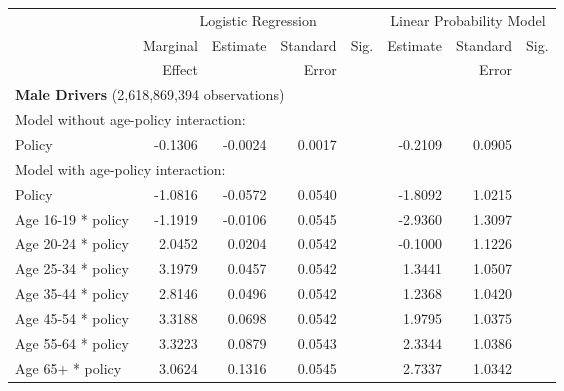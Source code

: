 
\begin{table}%
\centering 
\begin{tabular}{l r r r l r r l} 

\hline 
 
 & \multicolumn{4}{c}{Logistic Regression}  & \multicolumn{3}{c}{Linear Probability Model} \\ 

 \cmidrule(lr){2-5}\cmidrule(lr){6-8} 
 & Marginal & Estimate & Standard & Sig. & Estimate & Standard & Sig. \\ 
 &   Effect &          &  Error   &      &          &  Error   &     \\ 

\hline 
 
\multicolumn{7}{l}{\textbf{Male Drivers} (2,618,869,394 observations)} \\ 

\hline
\multicolumn{7}{l}{Model without age-policy interaction: } \\ 
Policy                   &  -0.1306       &  -0.0024        &  0.0017       &            &  -0.2109        &  0.0905       &            \\ 
\hline
\multicolumn{7}{l}{Model with age-policy interaction: } \\ 
Policy                   &  -1.0816       &  -0.0572        &  0.0540       &            &  -1.8092        &  1.0215       &            \\ 
Age 16-19 * policy   &  -1.1919       &  -0.0106        &  0.0545       &            &  -2.9360        &  1.3097       &            \\ 
Age 20-24 * policy   &  2.0452       &  0.0204        &  0.0542       &            &  -0.1000        &  1.1226       &            \\ 
Age 25-34 * policy   &  3.1979       &  0.0457        &  0.0542       &            &  1.3441        &  1.0507       &            \\ 
Age 35-44 * policy   &  2.8146       &  0.0496        &  0.0542       &            &  1.2368        &  1.0420       &            \\ 
Age 45-54 * policy   &  3.3188       &  0.0698        &  0.0542       &            &  1.9795        &  1.0375       &            \\ 
Age 55-64 * policy   &  3.3223       &  0.0879        &  0.0543       &            &  2.3344        &  1.0386       &            \\ 
Age 65+ * policy   &  3.0624       &  0.1316        &  0.0545       &            &  2.7337        &  1.0342       &            \\ 


\end{tabular}
\end{table}

